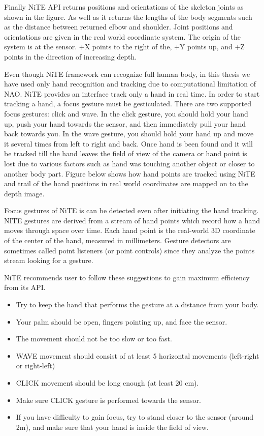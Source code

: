 Finally NiTE API returns positions and orientations of the skeleton joints as shown in the figure. As well as it returns the lengths of the body segments such as the distance between returned elbow and shoulder. Joint positions and orientations are given in the real world coordinate system. The origin of the system is at the sensor. +X points to the right of the, +Y points up, and +Z points in the direction of increasing depth. 

Even though NiTE framework can recognize full human body, in this thesis we have used only hand recognition and tracking due to computational limitation of NAO.  NiTE provides an interface track only a hand in real time.  In order to start tracking a hand, a focus gesture must be gesticulated. There are two supported focus gestures: click and wave. In the click gesture, you should hold your hand up, push your hand towards the sensor, and then immediately pull your hand back towards you. In the wave gesture, you should hold your hand up and move it several times from left to right and back. Once hand is been found and it will be tracked till the hand leaves the field of view of the camera or hand point is lost due to various factors such as hand was touching another object or closer to another body part. Figure below shows how hand points are tracked using NiTE and trail of the hand positions in real world coordinates are mapped on to the depth image.

Focus gestures of NiTE is can be detected even after initiating the hand tracking. NITE gestures are derived from a stream of hand points which record how a hand moves through space over time. Each hand point is the real-world 3D coordinate of the center of the hand, measured in millimeters. Gesture detectors are sometimes called point listeners (or point controls) since they analyze the points stream looking for a gesture. 

NiTE recommends user to follow these suggestions to gain maximum efficiency from its API.

\begin{itemize}
\item Try to keep the hand that performs the gesture at a distance from your body.
\item Your palm should be open, fingers pointing up, and face the sensor.
\item The movement should not be too slow or too fast.
\item WAVE movement should consist of at least 5 horizontal movements (left-right or right-left)
\item CLICK movement should be long enough (at least 20 cm).
\item Make sure CLICK gesture is performed towards the sensor.
\item If you have difficulty to gain focus, try to stand closer to the sensor (around 2m), and make sure that your hand is inside the field of view.
\end{itemize}

